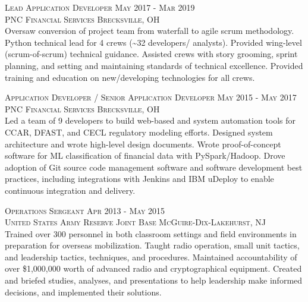 \documentclass[letterpaper, 11pt]{article} %
\begin{document}
\textsc{Lead Application Developer \hfill May 2017 - Mar 2019} \\
\textsc{PNC Financial Services \hfill Brecksville, OH} \\
Oversaw conversion of project team from waterfall to agile scrum methodology.
Python technical lead for 4 crews (\textasciitilde 32 developers/ analysts).
Provided wing-level (scrum-of-scrum) technical guidance.
Assisted crews with story grooming, sprint planning, and setting and maintaining standards of technical excellence.
Provided training and education on new/developing technologies for all crews.

\textsc{Application Developer / Senior Application Developer \hfill May 2015 - May 2017} \\
\textsc{PNC Financial Services \hfill Brecksville, OH} \\
Led a team of 9 developers to build web-based and system automation tools for CCAR, DFAST, and CECL regulatory modeling efforts.
Designed system architecture and wrote high-level design documents.
Wrote proof-of-concept software for ML classification of financial data with PySpark/Hadoop.
Drove adoption of Git source code management software and software development best practices, including integrations with Jenkins and IBM uDeploy to enable continuous integration and delivery.


\textsc{Operations Sergeant \hfill Apr 2013 - May 2015} \\
\textsc{United States Army Reserve \hfill Joint Base McGuire-Dix-Lakehurst, NJ} \\
Trained over 300 personnel in both classroom settings and field environments in preparation for overseas mobilization.
Taught radio operation, small unit tactics, and leadership tactics, techniques, and procedures.
Maintained accountability of over \$1,000,000 worth of advanced radio and cryptographical equipment.
Created and briefed studies, analyses, and presentations to help leadership make informed decisions, and implemented their solutions.
\end{document}
